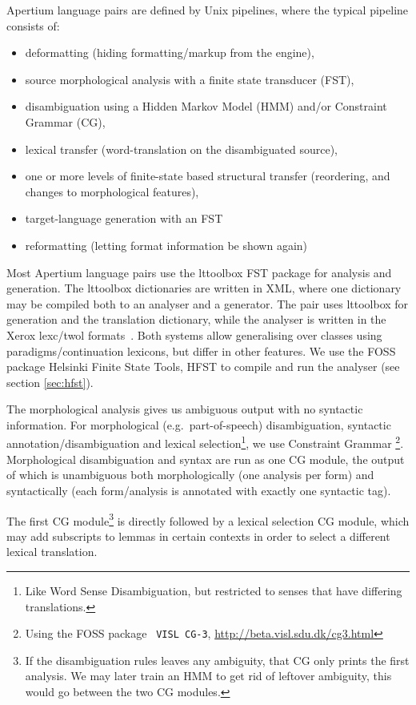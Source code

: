 \documentclass{book}
\begin{document}
Apertium language pairs are defined by Unix pipelines, where the
typical pipeline consists of:

\begin{itemize}
\item deformatting (hiding formatting/markup from the engine),
\item source morphological analysis with a finite state transducer
  (FST),
\item disambiguation using a Hidden Markov Model (HMM) and/or
  Constraint Grammar (CG), 
\item lexical transfer (word-translation on the disambiguated source),
\item one or more levels of finite-state based structural transfer
  (reordering, and changes to morphological features),
\item target-language generation with an FST
\item reformatting (letting format information be shown again)
\end{itemize}

Most Apertium language pairs use the lttoolbox FST package for
analysis and generation. The lttoolbox dictionaries are written in
XML, where one dictionary may be compiled both to an analyser and a
generator. The \smenob{} pair uses lttoolbox for \nob{} generation and
the translation dictionary, while the \sme{} analyser is written in the
Xerox lexc/twol formats~\citep{beesley2003fsm}. Both systems allow
generalising over classes using paradigms/continuation lexicons, but
differ in other features. We use the FOSS package Helsinki Finite
State Tools, HFST \citep{linden2011hfst} to compile and run the
analyser (see section \ref{sec:hfst}).

The morphological analysis gives us ambiguous output with no syntactic
information. For morphological (e.g.~part-of-speech) disambiguation,
syntactic annotation/disambiguation and lexical
selection\footnote{Like Word Sense Disambiguation, but restricted to
  senses that have differing translations.}, we use Constraint Grammar
\citep{karlsson1990cgf}\footnote{Using the FOSS package {\tt \small
    VISL CG-3},
  \href{http://beta.visl.sdu.dk/cg3.html}{http://beta.visl.sdu.dk/cg3.html}}.
Morphological disambiguation and syntax
are run as one CG module, the output of which is unambiguous both
morphologically (one analysis per form) and syntactically (each
form/analysis is annotated with exactly one syntactic tag).

The first CG module\footnote{If the disambiguation rules leaves any
  ambiguity, that CG only prints the first analysis. We may later
  train an HMM to get rid of leftover ambiguity, this would go between
  the two CG modules.} is directly followed by a lexical selection CG
module, which may add subscripts to lemmas in certain contexts in
order to select a different lexical translation.
\end{document}
